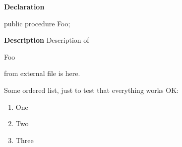 \documentclass{report}
\begin{document}
\begin{list}{}{
\setlength{\itemindent}{0cm}
\setlength{\listparindent}{0cm}
\setlength{\leftmargin}{\evensidemargin}
\addtolength{\leftmargin}{\tmplength}
\settowidth{\labelsep}{X}
\addtolength{\leftmargin}{\labelsep}
\setlength{\labelwidth}{\tmplength}
}
\begin{flushleft}
\item[\textbf{Declaration}\hfill]
\begin{ttfamily}
public procedure Foo;\end{ttfamily}


\end{flushleft}
\par
\item[\textbf{Description}]
Description of \begin{ttfamily}Foo\end{ttfamily} from external file is here.

Some ordered list, just to test that everything works OK: \begin{enumerate}
\setcounter{enumi}{0} \setcounter{enumii}{0} \setcounter{enumiii}{0} \setcounter{enumiv}{0} 
\item One
\setcounter{enumi}{1} \setcounter{enumii}{1} \setcounter{enumiii}{1} \setcounter{enumiv}{1} 
\item Two
\setcounter{enumi}{2} \setcounter{enumii}{2} \setcounter{enumiii}{2} \setcounter{enumiv}{2} 
\item Three
\end{enumerate}

\end{list}
\end{document}
